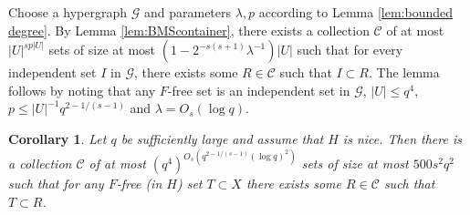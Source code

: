 \documentclass[11pt]{article}
\let\oldendproof\endproof
\renewenvironment{proof}[1][\proofname]{\oldproof[\bf #1]}{\oldendproof}
\theoremstyle{plain}
\newtheorem{corollary}[theorem]{Corollary}
\theoremstyle{definition}
\begin{document}
\begin{proof}
    Choose a hypergraph $\mathcal{G}$ and parameters $\lambda,p$ according to Lemma \ref{lem:bounded degree}. By Lemma \ref{lem:BMScontainer}, there exists a collection $\mathcal{C}$ of at most $|U|^{sp|U|}$ sets of size at most $(1-2^{-s(s+1)}\lambda^{-1})|U|$ such that for every independent set $I$ in $\mathcal{G}$, there exists some $R\in \mathcal{C}$ such that $I\subset R$. The lemma follows by noting that any $F$-free set is an independent set in $\mathcal{G}$, $|U|\leq q^4$, $p\leq |U|^{-1}q^{2-1/(s-1)}$ and $\lambda=O_s(\log q)$.
\end{proof}

\begin{corollary} \label{cor:few sets}
    Let $q$ be sufficiently large and assume that $H$ is nice. Then there is a collection $\mathcal{C}$ of at most $(q^4)^{O_s(q^{2-1/(s-1)}(\log q)^2)}$ sets of size at most $500s^2q^2$ such that for any $F$-free (in $H$) set $T\subset X$ there exists some $R\in \mathcal{C}$ such that $T\subset R$.
\end{corollary}
\end{document}
